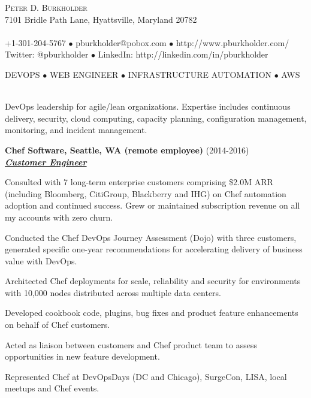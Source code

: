 \documentclass{article}
\newcommand{\lineunder}{\vspace*{-8pt} \\ \hspace*{-18pt} \hrulefill \\}
\newcommand{\header}[1]{{\hspace*{-15pt}\vspace*{6pt} \textsc{#1}} \vspace*{-6pt} \lineunder}
\newcommand{\centeredheader}[1]{
  \vspace*{6pt}
  \begin{center}
    \textsc{#1}
    \lineunder
  \end{center}
}
\newcommand{\employer}[3]{{ \textbf{#1} (#2)\\ \underline{\textbf{\emph{#3}}}\\ \nopagebreak }}
\newcommand{\contact}[3]{
    \vspace*{-8pt}
    \begin{center}
        {\LARGE \scshape {#1}}\\
        #2 \lineunder
        #3
    \end{center}
    \vspace*{-8pt}
}
\newenvironment{achievements}{\begin{list}{\topsep 0pt \itemsep -2pt}} {\vspace*{4pt}\end{list}}
\begin{document}
\smallskip
\vspace*{-44pt}

\contact{Peter D. Burkholder}
  {7101 Bridle Path Lane, Hyattsville, Maryland 20782}
  {+1-301-204-5767 $\bullet$ pburkholder@pobox.com  $\bullet$ http://www.pburkholder.com/ \linebreak Twitter: @pburkholder $\bullet$ LinkedIn: http://linkedin.com/in/pburkholder }

\centeredheader{DEVOPS $\bullet$ WEB ENGINEER $\bullet$ INFRASTRUCTURE AUTOMATION $\bullet$ AWS}
  DevOps leadership for agile/lean organizations. Expertise includes continuous delivery, security, cloud computing, capacity planning, configuration management, monitoring, and incident management.

\smallskip
\vspace*{16pt}


\employer{Chef Software, Seattle, WA (remote employee)}{2014-2016}{Customer Engineer}
\begin{achievements}
  \item Consulted with 7 long-term enterprise customers comprising \$2.0M ARR (including Bloomberg, CitiGroup, Blackberry and IHG) on Chef automation adoption and continued success. Grew or maintained subscription revenue on all my accounts with zero churn.
  \item Conducted the Chef DevOps Journey Assessment (Dojo) with three customers, generated specific one-year recommendations for accelerating delivery of business value with DevOps.
  \item Architected Chef deployments for scale, reliability and security for environments with 10,000 nodes distributed across multiple data centers.
  \item Developed cookbook code, plugins, bug fixes and product feature enhancements on behalf of Chef customers.
  \item Acted as liaison between customers and Chef product team to assess opportunities in new feature development.
  \item Represented Chef at DevOpsDays (DC and Chicago), SurgeCon, LISA, local meetups and Chef events.
\end{achievements}
\end{document}
